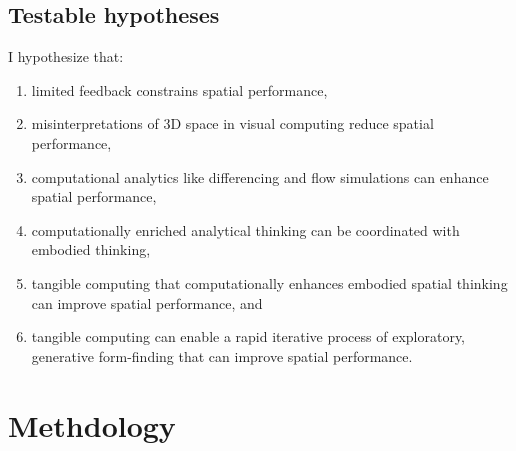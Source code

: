 \documentclass{sigchi}
\begin{document}

\subsection*{Testable hypotheses}
I hypothesize that:
\begin{enumerate}
	\item limited feedback constrains spatial performance,
	\item misinterpretations of 3D space in visual computing reduce spatial performance, 
	\item computational analytics like differencing and flow simulations can enhance spatial performance,
	\item computationally enriched analytical thinking can be coordinated with embodied thinking,
	\item tangible computing that computationally enhances embodied spatial thinking can improve spatial performance, and 
	\item tangible computing can enable a rapid iterative process of exploratory, generative form-finding that can improve spatial performance.
	
\end{enumerate}




\section{Methdology}
\end{document}
